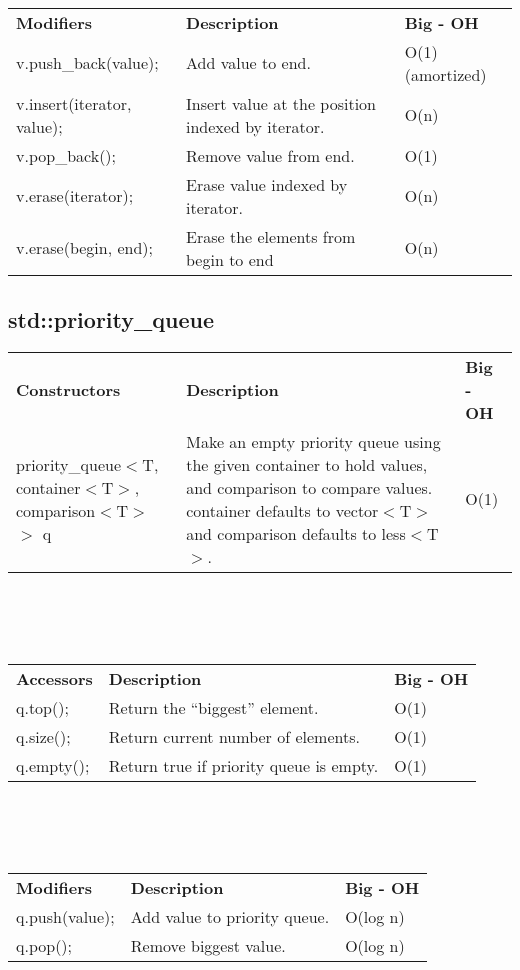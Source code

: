 \documentclass[12pt]{article}
\begin{document}
\\
\\
\\
\begin{tabular}{ l l l }
\textbf{Modifiers} & \textbf{Description} & \textbf{Big - OH}\\
v.push\_back(value); & Add value to end. & O(1) (amortized)\\
v.insert(iterator, value); & Insert value at the position indexed by iterator. & O(n)\\
v.pop\_back(); & Remove value from end. & O(1)\\
v.erase(iterator); & Erase value indexed by iterator. & O(n)\\
v.erase(begin, end); & Erase the elements from begin to end & O(n)\\
\end{tabular}
\clearpage
\subsection{std::priority\_queue}\label{pq}
\begin{tabular}{ p{5cm} p{7cm} p{5cm}}
\textbf{Constructors} & \textbf{Description} & \textbf{Big - OH}\\
priority\_queue$<$T,  container$<$T$>$,  comparison$<$T$>$ $>$ q & Make an empty priority queue using the given container to hold values, and comparison to compare values. container defaults to vector$<$T$>$ and comparison defaults to less$<$T$>$. & O(1)\end{tabular}
\\
\\
\\
\begin{tabular}{ l l l }
\textbf{Accessors} & \textbf{Description} & \textbf{Big - OH}\\
q.top(); & Return the ``biggest'' element. & O(1)\\
q.size(); & Return current number of elements. & O(1)\\
q.empty(); & Return true if priority queue is empty. & O(1)
\end{tabular}
\\
\\
\\
\begin{tabular}{ l l l }
\textbf{Modifiers} & \textbf{Description} & \textbf{Big - OH}\\
q.push(value); & Add value to priority queue. & O(log n)\\
q.pop(); & Remove biggest value. & O(log n)\\
\end{tabular}
\clearpage
\end{document}

